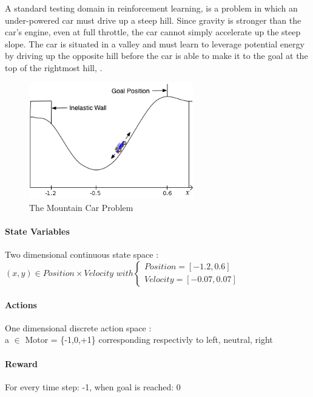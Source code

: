 \documentclass[a4paper,12pt]{article}
\begin{document}
    A standard testing domain in reinforcement learning, is a problem in which an under-powered 
    car must drive up a steep hill. Since gravity is stronger than the car's engine, even at full 
    throttle, the car cannot simply accelerate up the steep slope. The car is situated in a valley
    and must learn to leverage potential energy by driving up the opposite hill before the car is 
    able to make it to the goal at the top of the rightmost hill, \cite{ReinforceLearningIntro} .
    \begin{figure}[H]
      \begin{center}
	\includegraphics[width=270px]{Mcar}
	\caption{ The Mountain Car Problem }
	\end{center}
    \end{figure}
    
    \paragraph{State Variables}
    Two dimensional continuous state space : \\
    $(x,y) \in Position \times Velocity $
      $ with \left\lbrace \begin{array}{lll} 
      Position = [-1.2, 0.6]\\
      Velocity = [-0.07, 0.07]\
      \end{array} \right.$
    
    
    
    \paragraph{Actions}
     One dimensional discrete action space : \\
     a $\in$ Motor = \{-1,0,+1\} corresponding respectivly to left, neutral, right
     
     \paragraph{Reward}
      For every time step: -1, when goal is reached: 0
\end{document}
